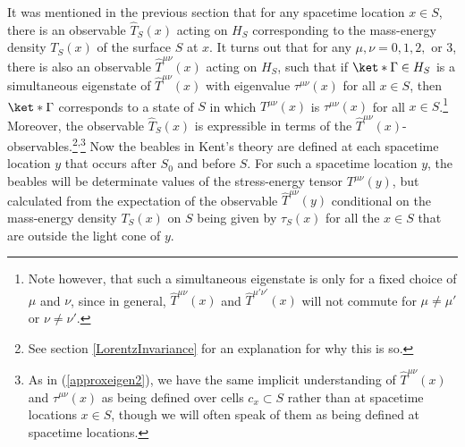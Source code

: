 \documentclass[12pt]{report}
\begin{document}
It was mentioned in the previous section that for any spacetime location $x\in S$,  there is an observable $\hat{T}_S(x)$ acting on $H_S$ corresponding to the mass-energy density $T_S(x)$ of the surface $S$ at $x$. It turns out that for any $\mu, \nu=0,1,2,$ or $3$, there is also an observable  $\hat{T}^{\mu\nu}(x)$ acting  %
%
 on $H_S$, such that if $\ket*{\Gamma}\in H_S$ is a simultaneous eigenstate of $\hat{T}^{\mu\nu}(x)$ with eigenvalue $\tau^{\mu\nu}(x)$ for  %
%
 all $x\in S$, then $\ket*{\Gamma}$ corresponds to a state of $S$ in which $T^{\mu\nu}(x)$ is  $\tau^{\mu\nu}(x)$ for all $x\in S$.\footnote{Note however, that such a simultaneous eigenstate is only for a fixed choice of $\mu$ and $\nu$, since in general, $\hat{T}^{\mu\nu}(x)$ and $\hat{T}^{\mu'\nu'}(x)$ will not commute for $\mu\neq\mu'$ or $\nu\neq\nu'$. } Moreover, the observable $\hat{T}_S(x)$ is expressible in terms of the  $\hat{T}^{\mu\nu}(x)$-observables.\footnote{See section  \ref{LorentzInvariance} for an explanation for why this is so.}\textsuperscript{,}\footnote{As in (\ref{approxeigen2}), we have the same implicit understanding of $\hat{T}^{\mu\nu}(x)$ and $\tau^{\mu\nu}(x)$ as being defined over cells $c_x\subset S$ rather than at spacetime locations $x\in S$, though we will often speak of them as being defined at spacetime locations. }
Now the  beables in Kent's theory are defined at each spacetime location $y$ that occurs after $S_0$ and before $S$. For such a spacetime location $y$, the beables will be determinate values of the stress-energy tensor $T^{\mu\nu}(y)$, but calculated from the expectation of the observable $\hat{T}^{\mu\nu}(y)$ conditional on the mass-energy density $T_S(x)$ on $S$ being given by $\tau_S(x)$ for all the $x\in S$ that are outside the light cone of $y$. 
\end{document}
